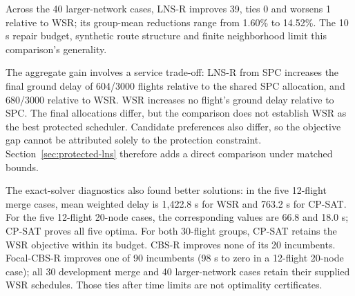 Across the 40 larger-network cases, LNS-R improves 39, ties 0 and worsens 1 relative to WSR; its group-mean reductions range from 1.60\% to 14.52\%. The 10 s repair budget, synthetic route structure and finite neighborhood limit this comparison's generality.

The aggregate gain involves a service trade-off: LNS-R from SPC increases the final ground delay of 604/3000 flights relative to the shared SPC allocation, and 680/3000 relative to WSR. WSR increases no flight's ground delay relative to SPC. The final allocations differ, but the comparison does not establish WSR as the best protected scheduler. Candidate preferences also differ, so the objective gap cannot be attributed solely to the protection constraint. Section~\ref{sec:protected-lns} therefore adds a direct comparison under matched bounds.

The exact-solver diagnostics also found better solutions: in the five 12-flight merge cases, mean weighted delay is 1,422.8 s for WSR and 763.2 s for CP-SAT. For the five 12-flight 20-node cases, the corresponding values are 66.8 and 18.0 s; CP-SAT proves all five optima. For both 30-flight groups, CP-SAT retains the WSR objective within its budget. CBS-R improves none of its 20 incumbents. Focal-CBS-R improves one of 90 incumbents (98 s to zero in a 12-flight 20-node case); all 30 development merge and 40 larger-network cases retain their supplied WSR schedules. Those ties after time limits are not optimality certificates.
